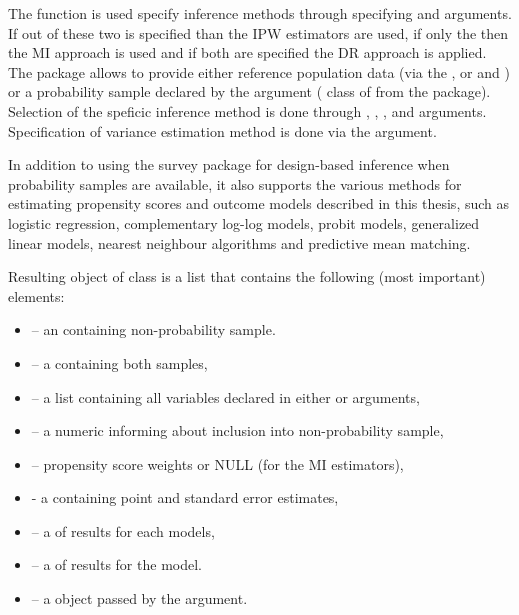 \documentclass[
]{jss}
\begin{document}
The  function is used specify inference methods through
specifying  and  arguments. If out of
these two  is specified than the IPW estimators are
used, if only the  then the MI approach is used and if
both are specified the DR approach is applied. The package allows to
provide either reference population data (via the , or
 and ) or a probability sample declared
by the  argument ( class of from the
 package). Selection of the speficic inference method is
done through , ,
,  and
 arguments. Specification of variance estimation
method is done via the  argument.

In addition to using the survey package for design-based inference when
probability samples are available, it also supports the various methods
for estimating propensity scores and outcome models described in this
thesis, such as logistic regression, complementary log-log models,
probit models, generalized linear models, nearest neighbour algorithms
and predictive mean matching.

Resulting object of class  is a list that contains the
following (most important) elements:

\begin{itemize}
\item {} -- an  containing non-probability sample.
\item {} -- a  containing both samples,
\item {} -- a list containing all variables declared in either  or  arguments,
\item {} -- a numeric  informing about inclusion into non-probability sample,
\item {} -- propensity score weights or NULL (for the MI estimators),
\item {} - a  containing point and standard error estimates,
\item {} -- a  of results for each  models,
\item {} -- a  of results for the  model.
\item {} -- a  object passed by the  argument.
\end{itemize}
\end{document}
